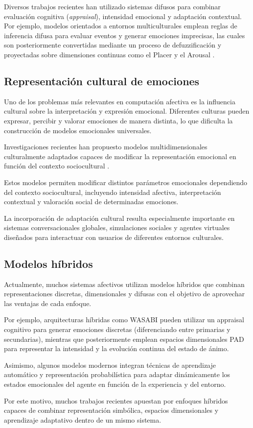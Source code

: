 Diversos trabajos recientes han utilizado sistemas difusos para combinar evaluación cognitiva (\textit{appraisal}), intensidad emocional y adaptación contextual. Por ejemplo, modelos orientados a entornos multiculturales emplean reglas de inferencia difusa para evaluar eventos y generar emociones imprecisas, las cuales son posteriormente convertidas mediante un proceso de defuzzificación y proyectadas sobre dimensiones continuas como el Placer y el Arousal \cite{taverner2021fuzzy}.

\subsection{Representación cultural de emociones}

Uno de los problemas más relevantes en computación afectiva es la influencia cultural sobre la interpretación y expresión emocional. Diferentes culturas pueden expresar, percibir y valorar emociones de manera distinta, lo que dificulta la construcción de modelos emocionales universales.

Investigaciones recientes han propuesto modelos multidimensionales culturalmente adaptados capaces de modificar la representación emocional en función del contexto sociocultural \cite{taverner2023multidimensional}.

Estos modelos permiten modificar distintos parámetros emocionales dependiendo del contexto sociocultural, incluyendo intensidad afectiva, interpretación contextual y valoración social de determinadas emociones.

La incorporación de adaptación cultural resulta especialmente importante en sistemas conversacionales globales, simulaciones sociales y agentes virtuales diseñados para interactuar con usuarios de diferentes entornos culturales.

\subsection{Modelos híbridos}

Actualmente, muchos sistemas afectivos utilizan modelos híbridos que combinan representaciones discretas, dimensionales y difusas con el objetivo de aprovechar las ventajas de cada enfoque.

Por ejemplo, arquitecturas híbridas como WASABI \cite{becker2009wasabi} pueden utilizar un appraisal cognitivo para generar emociones discretas (diferenciando entre primarias y secundarias), mientras que posteriormente emplean espacios dimensionales PAD para representar la intensidad y la evolución continua del estado de ánimo.

Asimismo, algunos modelos modernos integran técnicas de aprendizaje automático y representación probabilística para adaptar dinámicamente los estados emocionales del agente en función de la experiencia y del entorno.

Por este motivo, muchos trabajos recientes apuestan por enfoques híbridos capaces de combinar representación simbólica, espacios dimensionales y aprendizaje adaptativo dentro de un mismo sistema.